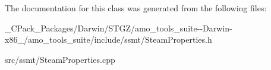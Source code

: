 The documentation for this class was generated from the following files\+:\begin{DoxyCompactItemize}
\item 
\+\_\+\+C\+Pack\+\_\+\+Packages/\+Darwin/\+S\+T\+G\+Z/amo\+\_\+tools\+\_\+suite-\/-\/\+Darwin-\/x86\+\_/amo\+\_\+tools\+\_\+suite/include/ssmt/Steam\+Properties.\+h\item 
src/ssmt/Steam\+Properties.\+cpp\end{DoxyCompactItemize}
